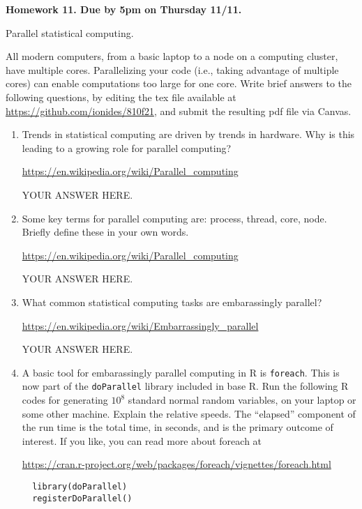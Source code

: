 \documentclass[12pt]{article}
\begin{document}
\begin{center}\bf
Homework 11. Due by 5pm on Thursday 11/11.

Parallel statistical computing.

\end{center}

All modern computers, from a basic laptop to a node on a computing cluster, have multiple cores. Parallelizing your code (i.e., taking advantage of multiple cores) can enable computations too large for one core. Write brief answers to the following questions, by editing the tex file available at \url{https://github.com/ionides/810f21}, and submit the resulting pdf file via Canvas. 

\begin{enumerate}

\item Trends in statistical computing are driven by trends in hardware. Why is this leading to a growing role for parallel computing?

\url{https://en.wikipedia.org/wiki/Parallel_computing}

YOUR ANSWER HERE.

\item Some key terms for parallel computing are: process, thread, core, node. Briefly define these in your own words.

\url{https://en.wikipedia.org/wiki/Parallel_computing}

YOUR ANSWER HERE.
  
\item What common statistical computing tasks are embarassingly parallel?

\url{https://en.wikipedia.org/wiki/Embarrassingly_parallel}

YOUR ANSWER HERE.

\item A basic tool for embarassingly parallel computing in R is \texttt{foreach}. This is now part of the \texttt{doParallel} library included in base R. Run the following R codes for generating $10^8$ standard normal random variables, on your laptop or some other machine. Explain the relative speeds. The ``elapsed'' component of the run time is the total time, in seconds, and is the primary outcome of interest. If you like, you can read more about foreach at
  
\url{https://cran.r-project.org/web/packages/foreach/vignettes/foreach.html}

\begin{verbatim} 
  library(doParallel)
  registerDoParallel()


\end{verbatim}
\end{enumerate}
\end{document}
